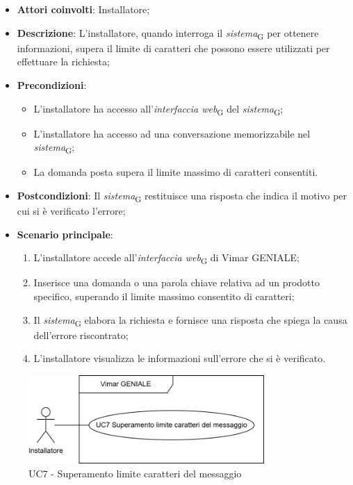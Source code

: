 \begin{itemize}
    \item \textbf{Attori coinvolti}: Installatore;
    \item \textbf{Descrizione}: L’installatore, quando interroga il \textit{sistema}\textsubscript{G} per ottenere informazioni, supera il limite di caratteri che possono essere utilizzati per effettuare la richiesta;
    \item \textbf{Precondizioni}: 
        \begin{itemize}
            \item L’installatore ha accesso all’\textit{interfaccia web}\textsubscript{G} del \textit{sistema}\textsubscript{G};
            \item L’installatore ha accesso ad una conversazione memorizzabile nel \textit{sistema}\textsubscript{G};
            \item La domanda posta supera il limite massimo di caratteri consentiti.
        \end{itemize}
    \item \textbf{Postcondizioni}: Il \textit{sistema}\textsubscript{G} restituisce una risposta che indica il motivo per cui si è verificato l’errore;
    \item \textbf{Scenario principale}:
    \begin{enumerate}
    \item L’installatore accede all’\textit{interfaccia web}\textsubscript{G} di Vimar GENIALE;
    \item Inserisce una domanda o una parola chiave relativa ad un prodotto specifico, superando il limite massimo consentito di caratteri;
    \item Il \textit{sistema}\textsubscript{G} elabora la richiesta e fornisce una risposta che spiega la causa dell'errore riscontrato;
    \item L’installatore visualizza le informazioni sull’errore che si è verificato.
    \end{enumerate}
\end{itemize}
\begin{figure}[H]
\centering
\includegraphics[width=0.8\textwidth]{contents/casi_duso/png/UC7.png}
\caption{UC7 - Superamento limite caratteri del messaggio}
\end{figure}


